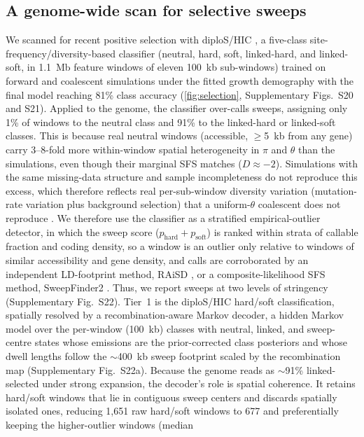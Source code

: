 \documentclass[11pt]{article}
\begin{document}
\subsection{A genome-wide scan for selective sweeps}\label{sec:sweep}
We scanned for recent positive selection with diploS/HIC \citep{schrider2016,kern2018diploshic}, a five-class
site-frequency/diversity-based classifier (neutral, hard, soft, linked-hard, and linked-soft, in 1.1~Mb feature windows of eleven 100~kb sub-windows) trained on forward and coalescent simulations under the fitted growth
demography with the final model reaching 81\% class accuracy (\cref{fig:selection}, Supplementary Figs.~S20 and S21).
Applied to the genome, the classifier over-calls sweeps, assigning only 1\% of windows to the neutral class and 91\% to the linked-hard or linked-soft classes.
This is because real neutral windows (accessible, $\geq$5~kb from any gene) carry 3--8-fold more
within-window spatial heterogeneity in $\pi$ and $\theta$ than the simulations, even though their marginal
SFS matches ($D\approx-2$). Simulations with the same missing-data structure and sample incompleteness do not reproduce this excess,
which therefore reflects real per-sub-window diversity variation (mutation-rate variation plus background selection)
that a uniform-$\theta$ coalescent does not reproduce \citep{johri2022}. We therefore use the classifier as a stratified empirical-outlier detector,
in which the sweep score ($p_\mathrm{hard}+p_\mathrm{soft}$) is ranked within strata of callable fraction and coding density,
so a window is an outlier only relative to windows of similar accessibility and gene density, and calls are corroborated by an
independent LD-footprint method, RAiSD \citep{alachiotis2018raisd}, or a composite-likelihood SFS method, SweepFinder2 \citep{nielsen2005,degiorgio2016}.
Thus, we report sweeps at two levels of stringency (Supplementary Fig.~S22). Tier~1 is the diploS/HIC hard/soft classification,
spatially resolved by a recombination-aware Markov decoder, a hidden Markov model over the per-window (100~kb) classes with neutral,
linked, and sweep-centre states whose emissions are the prior-corrected class posteriors and whose dwell lengths
follow the $\sim$400~kb sweep footprint scaled by the recombination map (Supplementary Fig.~S22a). Because the genome
reads as $\sim$91\% linked-selected under strong expansion, the decoder's role is spatial coherence.
It retains hard/soft windows that lie in contiguous sweep centers and discards spatially isolated ones,
reducing 1{,}651 raw hard/soft windows to 677 and preferentially keeping the higher-outlier windows (median
\end{document}
